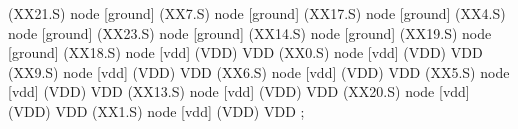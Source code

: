 \begin{circuitikz}[american]

	(XX21.S) node [ground] {}
	(XX7.S) node [ground] {}
	(XX17.S) node [ground] {}
	(XX4.S) node [ground] {}
	(XX23.S) node [ground] {}
	(XX14.S) node [ground] {}
	(XX19.S) node [ground] {}
	(XX18.S) node [vdd] (VDD) {VDD}
	(XX0.S) node [vdd] (VDD) {VDD}
	(XX9.S) node [vdd] (VDD) {VDD}
	(XX6.S) node [vdd] (VDD) {VDD}
	(XX5.S) node [vdd] (VDD) {VDD}
	(XX13.S) node [vdd] (VDD) {VDD}
	(XX20.S) node [vdd] (VDD) {VDD}
	(XX1.S) node [vdd] (VDD) {VDD}
;

\end{circuitikz}
